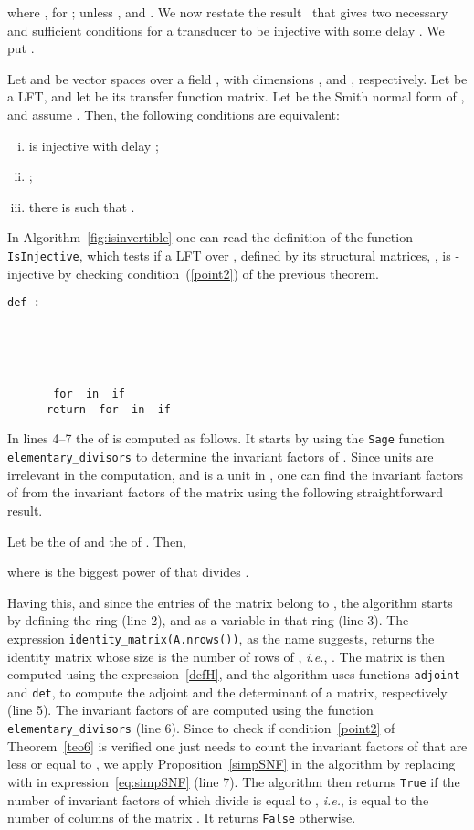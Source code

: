 \documentclass{ocg}
\newcommand{\LFT}{LFT}
\begin{document}
where , for ;  unless ,
and .  We now restate the result~\cite{ITA:9218509} that gives two
necessary and sufficient conditions for a transducer to be injective
with some delay . We put .
\begin{theorem}\label{teo6}
Let  and  be vector spaces over a field
  , with dimensions ,  and , respectively. Let 
  be a \LFT{}, and let  be its transfer function
  matrix. Let  be the
  Smith normal form of , and assume . Then, the
  following conditions are equivalent:
\begin{enumerate}[(i)]
  \item  is injective with delay  \label{item1};\label{point1}
  \item  \label{item2};\label{point2}
  \item there is  such that
    .\label{item3}
  \end{enumerate}
\end{theorem}
In Algorithm~\ref{fig:isinvertible} one can read the definition of the function
\texttt{IsInjective}, which tests if a \LFT{} over , defined by
its structural matrices, , is -injective by checking condition~(\ref{point2}) of the previous theorem.
\begin{lstlisting}[caption={Testing if a \LFT{} over  is injective with some
    delay .},label={fig:isinvertible}]
  def : 
      
      
      
      
      
       for  in  if 
      return  for  in  if 
\end{lstlisting}
In lines 4--7 the  of  is computed as follows. It starts
by using the \texttt{Sage} function \texttt{elementary\_divisors} to determine the
invariant factors of . Since
units are irrelevant in the  computation, and  is a unit
in , one can find the invariant factors of 
from the invariant factors of the matrix  using the
following straightforward result.
\begin{proposition}\label{simpSNF}
  Let  be the
   of  and
   the  of
  . Then,
 
where  is the biggest power of  that divides
  .
\end{proposition}
Having this, and since the entries of the matrix  belong to , the algorithm starts by defining the ring  (line 2), and  as a variable in that ring (line 3).  
The expression \texttt{identity\_matrix(A.nrows())}, as the name suggests, returns the identity matrix whose size is the number of rows of ,
{\it i.e.}, . 
The matrix  is then computed using the expression~\eqref{defH}, and the algorithm uses functions \texttt{adjoint} and \texttt{det}, to compute the adjoint and the determinant of a matrix, respectively (line 5). 
The invariant factors of  are computed using the
function \texttt{elementary\_divisors} (line 6). Since to check if
condition~\eqref{point2} of Theorem~\ref{teo6} is verified one just
needs to count the invariant factors of  that are less or equal
to , we apply Proposition~\ref{simpSNF} in the algorithm by
replacing  with  in expression~\eqref{eq:simpSNF}
(line 7). The algorithm then returns \texttt{True} if the number of
invariant factors of  which divide  is equal to ,
\textit{i.e.}, is equal to the number of columns of the matrix . It
returns \texttt{False} otherwise.
\end{document}
